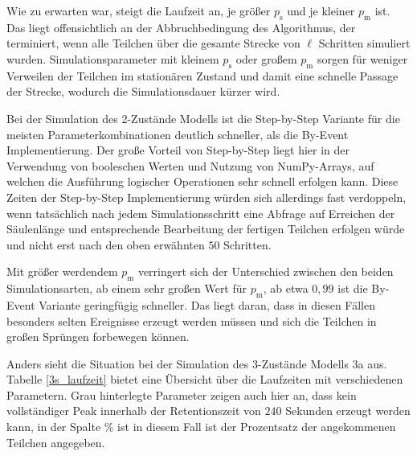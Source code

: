 Wie zu erwarten war, steigt die Laufzeit an, je größer $p_\text{s}$ und je kleiner $p_\text{m}$ ist. Das liegt offensichtlich an der Abbruchbedingung des Algorithmus, der terminiert, wenn alle Teilchen über die gesamte Strecke von $\ell$ Schritten simuliert wurden. Simulationsparameter mit kleinem $p_\text{s}$ oder großem $p_\text{m}$ sorgen für weniger Verweilen der Teilchen im stationären Zustand und damit eine schnelle Passage der Strecke, wodurch die Simulationsdauer kürzer wird. 

Bei der Simulation des 2-Zustände Modells ist die Step-by-Step Variante für die meisten Parameterkombinationen deutlich schneller, als die By-Event Implementierung. Der große Vorteil von Step-by-Step liegt hier in der Verwendung von booleschen Werten und Nutzung von NumPy-Arrays, auf welchen die Ausführung logischer Operationen sehr schnell erfolgen kann. Diese Zeiten der Step-by-Step Implementierung würden sich allerdings fast verdoppeln, wenn tatsächlich nach jedem Simulationsschritt eine Abfrage auf Erreichen der Säulenlänge und entsprechende Bearbeitung der fertigen Teilchen erfolgen würde und nicht erst nach den oben erwähnten $50$ Schritten.

Mit größer werdendem $p_\text{m}$ verringert sich der Unterschied zwischen den beiden Simulationsarten, ab einem sehr großen Wert für $p_{\text{m}}$, ab etwa $0,99$ ist die By-Event Variante geringfügig schneller. Das liegt daran, dass in diesen Fällen besonders selten Ereignisse erzeugt werden müssen und sich die Teilchen in großen Sprüngen forbewegen können. 

Anders sieht die Situation bei der Simulation des 3-Zustände Modells 3a aus. Tabelle \ref{3s_laufzeit} bietet eine Übersicht über die Laufzeiten mit verschiedenen Parametern.
Grau hinterlegte Parameter zeigen auch hier an, dass kein vollständiger Peak innerhalb der Retentionszeit von $240$ Sekunden erzeugt werden kann, in der Spalte \% ist in diesem Fall ist der Prozentsatz der angekommenen Teilchen angegeben. 

